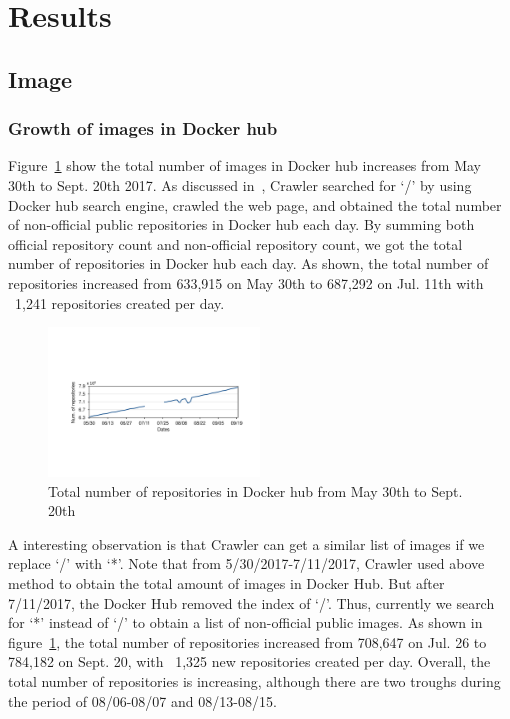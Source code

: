 
\section{Results}

\subsection{Image}

\subsubsection{Growth of images in Docker hub}

Figure~\ref{fig_image_growth} show the total number of images in Docker hub increases from May 30th to Sept. 20th 2017. As discussed in~\cite{XXX}, Crawler searched for `/' by using Docker hub search engine, crawled the web page, and obtained the total number of non-official public repositories in Docker hub each day. By summing both official repository count and non-official repository count, we got the total number of repositories in Docker hub each day. As shown, the total number of repositories increased from 633,915 on May 30th to 687,292 on Jul. 11th with ~1,241 repositories created per day.

\begin{figure}
  \centering
  \includegraphics[width=0.5\textwidth]{graphs/image_growth.pdf}
  \caption{Total number of repositories in Docker hub from May 30th to Sept. 20th}\label{fig_image_growth}
\end{figure}

A interesting observation is that Crawler can get a similar list of images if we replace `/' with `*'. Note that from 5/30/2017-7/11/2017, Crawler used above method to obtain the total amount of images in Docker Hub. But after 7/11/2017, the Docker Hub removed the index of `/'. Thus, currently we search for `*' instead of `/' to obtain a list of non-official public images. As shown in figure~\ref{fig_image_growth}, the total number of repositories increased from 708,647 on Jul. 26 to 784,182 on Sept. 20, with ~1,325 new repositories created per day. Overall, the total number of repositories is increasing, although there are two troughs during the period of 08/06-08/07 and 08/13-08/15.

